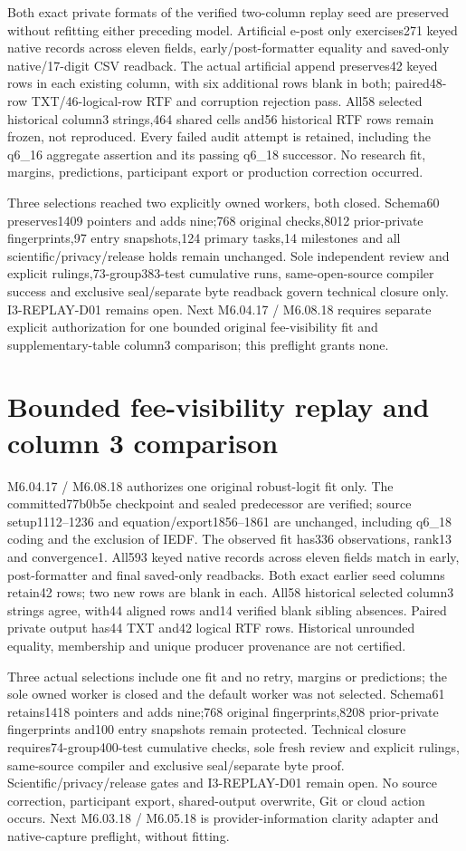 \documentclass[11pt,a4paper]{article}
\begin{document}
Both exact private formats of the verified two-column replay seed are preserved without refitting either preceding model. Artificial e-post only exercises271 keyed native records across eleven fields, early/post-formatter equality and saved-only native/17-digit CSV readback. The actual artificial append preserves42 keyed rows in each existing column, with six additional rows blank in both; paired48-row TXT/46-logical-row RTF and corruption rejection pass. All58 selected historical column3 strings,464 shared cells and56 historical RTF rows remain frozen, not reproduced. Every failed audit attempt is retained, including the q6\_16 aggregate assertion and its passing q6\_18 successor. No research fit, margins, predictions, participant export or production correction occurred.

Three selections reached two explicitly owned workers, both closed. Schema60 preserves1409 pointers and adds nine;768 original checks,8012 prior-private fingerprints,97 entry snapshots,124 primary tasks,14 milestones and all scientific/privacy/release holds remain unchanged. Sole independent review and explicit rulings,73-group383-test cumulative runs, same-open-source compiler success and exclusive seal/separate byte readback govern technical closure only. I3-REPLAY-D01 remains open. Next M6.04.17 / M6.08.18 requires separate explicit authorization for one bounded original fee-visibility fit and supplementary-table column3 comparison; this preflight grants none.
\section{Bounded fee-visibility replay and column 3 comparison}

M6.04.17 / M6.08.18 authorizes one original robust-logit fit only. The committed77b0b5e checkpoint and sealed predecessor are verified; source setup1112--1236 and equation/export1856--1861 are unchanged, including q6\_18 coding and the exclusion of IEDF. The observed fit has336 observations, rank13 and convergence1. All593 keyed native records across eleven fields match in early, post-formatter and final saved-only readbacks. Both exact earlier seed columns retain42 rows; two new rows are blank in each. All58 historical selected column3 strings agree, with44 aligned rows and14 verified blank sibling absences. Paired private output has44 TXT and42 logical RTF rows. Historical unrounded equality, membership and unique producer provenance are not certified.

Three actual selections include one fit and no retry, margins or predictions; the sole owned worker is closed and the default worker was not selected. Schema61 retains1418 pointers and adds nine;768 original fingerprints,8208 prior-private fingerprints and100 entry snapshots remain protected. Technical closure requires74-group400-test cumulative checks, sole fresh review and explicit rulings, same-source compiler and exclusive seal/separate byte proof. Scientific/privacy/release gates and I3-REPLAY-D01 remain open. No source correction, participant export, shared-output overwrite, Git or cloud action occurs. Next M6.03.18 / M6.05.18 is provider-information clarity adapter and native-capture preflight, without fitting.
\end{document}

